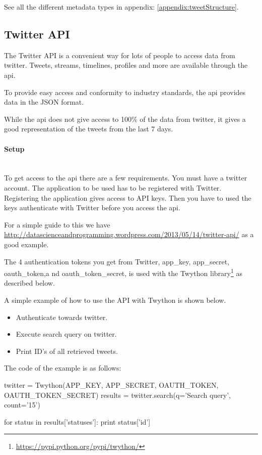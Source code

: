 See all the different metadata types in appendix: \ref{appendix:tweetStructure}.
%

\subsection{Twitter API}
The Twitter API is a convenient way for lots of people to access data from
twitter. Tweets, streams, timelines, profiles and more are available through
the api. 

To provide easy access and conformity to industry standards, the api
provides data in the JSON format. 

While the api does not give access to 100\% of the data from twitter, it gives
a good representation of the tweets from the last 7 days.
%

\paragraph{Setup}
\hspace{0pt}\\
To get access to the api there are a few requirements. You must have a
twitter account. The application to be used has to be registered with Twitter.
Registering the application gives access to API keys. Then you have to used the
keys authenticate with Twitter before you access the api. 

For a simple guide to this we have
\url{http://datascienceandprogramming.wordpress.com/2013/05/14/twitter-api/} as
a good example.

The 4 authentication tokens you get from Twitter, app\_key, app\_secret, oauth\_token,a nd
oauth\_token\_secret, is used with the Twython
library\footnote{\url{https://pypi.python.org/pypi/twython/}} as described
below.

A simple example of how to use the API with Twython is shown below. 
\begin{itemize}
	\item Authenticate towards twitter.
	\item Execute search query on twitter.
	\item Print ID's of all retrieved tweets.
\end{itemize} 

The code of the example is as follows:
\begin{python}
twitter = Twython(APP_KEY, APP_SECRET, OAUTH_TOKEN, OAUTH_TOKEN_SECRET)
results = twitter.search(q='Search query', count='15')

for status in results['statuses']:
    print status['id']
\end{python}

